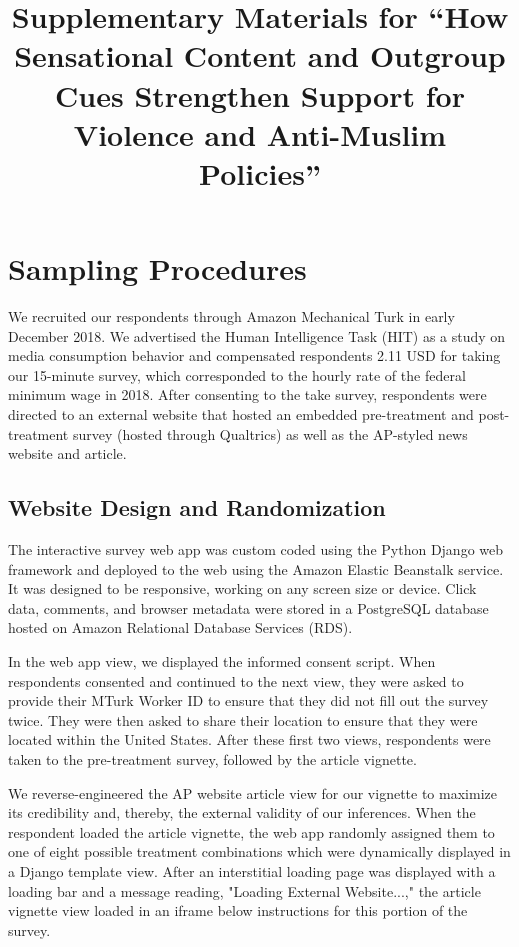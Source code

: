 \documentclass[]{article}
\title{\vspace{-4em}Supplementary Materials for ``How Sensational Content and Outgroup Cues Strengthen Support for Violence and Anti-Muslim Policies''}
\date{\vspace{-10ex}}
\begin{document}

\maketitle 
\tableofcontents
\newpage
\setcounter{page}{1}
\section{Sampling Procedures}

We recruited our respondents through Amazon Mechanical Turk in early December 2018. We advertised the Human Intelligence Task (HIT) as a study on media consumption behavior and compensated respondents 2.11 USD for taking our 15-minute survey, which corresponded to the hourly rate of the federal minimum wage in 2018. After consenting to the take survey, respondents were directed to an external website that hosted an embedded pre-treatment and post-treatment survey (hosted through Qualtrics) as well as the AP-styled news website and article. 

\subsection{Website Design and Randomization}

The interactive survey web app was custom coded using the Python Django web framework and deployed to the web using the Amazon Elastic Beanstalk service. It was designed to be responsive, working on any screen size or device. Click data, comments, and browser metadata were stored in a PostgreSQL database hosted on Amazon Relational Database Services (RDS).

In the web app view, we displayed the informed consent script. When respondents consented and continued to the next view, they were asked to provide their MTurk Worker ID to ensure that they did not fill out the survey twice. They were then asked to share their location to ensure that they were located within the United States. After these first two views, respondents were taken to the pre-treatment survey, followed by the article vignette.

We reverse-engineered the AP website article view for our vignette to maximize its credibility and, thereby, the external validity of our inferences. When the respondent loaded the article vignette, the web app randomly assigned them to one of eight possible treatment combinations which were dynamically displayed in a Django template view. After an interstitial loading page was displayed with a loading bar and a message reading, "Loading External Website...," the article vignette view loaded in an iframe below instructions for this portion of the survey.
\end{document}
